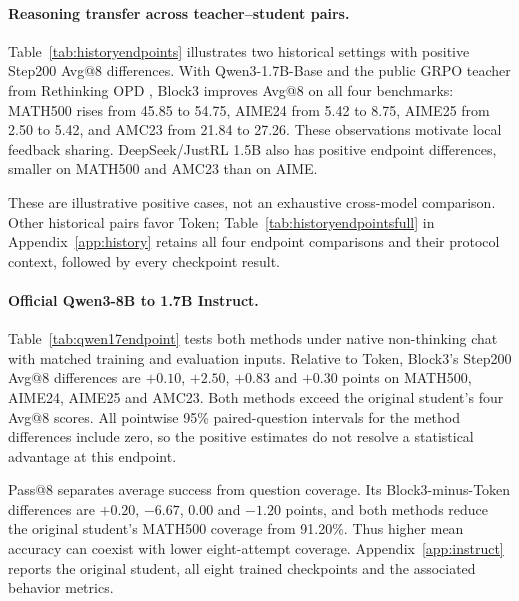 \paragraph{Reasoning transfer across teacher--student pairs.}
Table~\ref{tab:historyendpoints} illustrates two historical settings with positive Step200 Avg@8 differences. With Qwen3-1.7B-Base and the public GRPO teacher from Rethinking OPD \citep{rethinking}, Block3 improves Avg@8 on all four benchmarks: MATH500 rises from 45.85 to 54.75, AIME24 from 5.42 to 8.75, AIME25 from 2.50 to 5.42, and AMC23 from 21.84 to 27.26. These observations motivate local feedback sharing. DeepSeek/JustRL 1.5B also has positive endpoint differences, smaller on MATH500 and AMC23 than on AIME.

These are illustrative positive cases, not an exhaustive cross-model comparison. Other historical pairs favor Token; Table~\ref{tab:historyendpointsfull} in Appendix~\ref{app:history} retains all four endpoint comparisons and their protocol context, followed by every checkpoint result.

\begin{table}[htbp]
\centering\small
\caption{Selected positive historical Step200 Avg@8 examples (\%). Compare methods only within each student stratum. The complete comparison, including negative outcomes, appears in Table~\ref{tab:historyendpointsfull}.}
\label{tab:historyendpoints}

\end{table}

\paragraph{Official Qwen3-8B to 1.7B Instruct.}
Table~\ref{tab:qwen17endpoint} tests both methods under native non-thinking chat with matched training and evaluation inputs. Relative to Token, Block3's Step200 Avg@8 differences are $+0.10$, $+2.50$, $+0.83$ and $+0.30$ points on MATH500, AIME24, AIME25 and AMC23. Both methods exceed the original student's four Avg@8 scores. All pointwise 95\% paired-question intervals for the method differences include zero, so the positive estimates do not resolve a statistical advantage at this endpoint.

Pass@8 separates average success from question coverage. Its Block3-minus-Token differences are $+0.20$, $-6.67$, $0.00$ and $-1.20$ points, and both methods reduce the original student's MATH500 coverage from 91.20\%. Thus higher mean accuracy can coexist with lower eight-attempt coverage. Appendix~\ref{app:instruct} reports the original student, all eight trained checkpoints and the associated behavior metrics.


